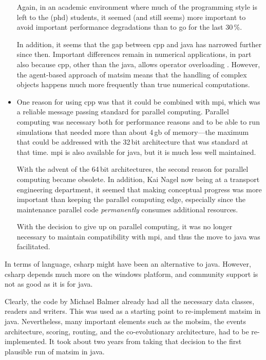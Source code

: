 \begin{itemize}
Again, in an academic environment where much of the programming style is left to the (\gls{phd}) students, it seemed (and still seems) more important to avoid important performance degradations than to go for the last 30\,\%.


In addition, it seems that the gap between \gls{cpp} and \gls{java} has narrowed further since then.  Important differences remain in numerical applications, in part also because \gls{cpp}, other than the \gls{java}, allows operator overloading \citep{..}.  However, the agent-based approach of \gls{matsim} means that the handling of complex objects happens much more frequently than true numerical computations.

\item One reason for using \gls{cpp} was that it could be combined with \gls{mpi}, which was a reliable message passing standard for parallel computing.  Parallel computing was necessary both for performance reasons and to be able to run simulations that needed more than about 4\,\gls{gb} of memory---the maximum that could be addressed with the 32\,bit architecture that was standard at that time.  \gls{mpi} is also available for \gls{java}, but it is much less well maintained.

With the advent of the 64\,bit architectures, the second reason for parallel computing became obsolete. In addition, Kai Nagel now being at a transport engineering department, it seemed that making conceptual progress was more important than keeping the parallel computing edge, especially since the maintenance parallel code \emph{permanently} consumes additional resources.

With the decision to give up on parallel computing, it was no longer necessary to maintain compatibility with \gls{mpi}, and thus the move to \gls{java} was facilitated.

\end{itemize}
%
In terms of language, \gls{csharp} might have been an alternative to \gls{java}.  However, \gls{csharp} depends much more on the \gls{windows} platform, and community support is not as good as it is for \gls{java}.

Clearly, the code by Michael Balmer already had all the necessary data classes, readers and writers.  This was used as a starting point to re-implement \gls{matsim} in \gls{java}.  Nevertheless, many important elements such as the \gls{mobsim}, the events architecture, scoring, routing, and the co-evolutionary architecture, had to be re-implemented.  It took about two years from taking that decision to the first plausible run of \gls{matsim} in \gls{java}.

